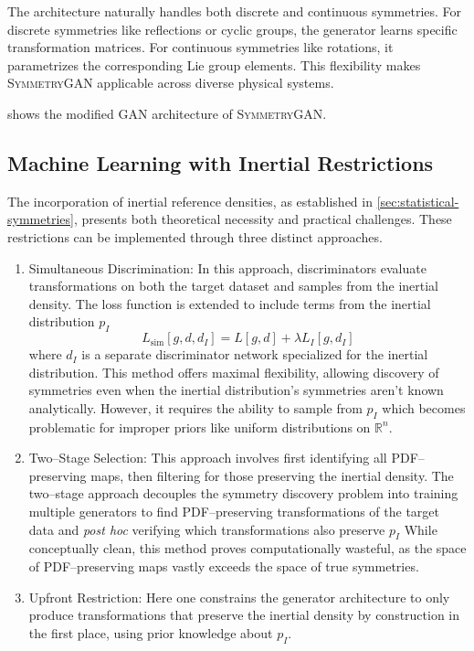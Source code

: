     The architecture naturally handles both discrete and continuous symmetries.
    For discrete symmetries like reflections or cyclic groups, the generator learns specific transformation matrices.
    For continuous symmetries like rotations, it parametrizes the corresponding Lie group elements.
    This flexibility makes \textsc{SymmetryGAN} applicable across diverse physical systems.

     shows the modified GAN architecture of \textsc{SymmetryGAN}.
    
    \subsection{Machine Learning with Inertial Restrictions}
    The incorporation of inertial reference densities, as established in \cref{sec:statistical-symmetries}, presents both theoretical necessity and practical challenges.
    These restrictions can be implemented through three distinct approaches.
    \begin{enumerate}
        \item Simultaneous Discrimination:
            In this approach, discriminators evaluate transformations on both the target dataset and samples from the inertial density.
            The loss function is extended to include terms from the inertial distribution \(p_I\)
            \[
                L_{\text{sim}}[g,d,d_I] = L[g,d] + \lambda L_I[g,d_I]
            \]
            where \(d_I\) is a separate discriminator network specialized for the inertial distribution.
            This method offers maximal flexibility, allowing discovery of symmetries even when the inertial distribution's symmetries aren't known analytically.
            However, it requires the ability to sample from \(p_I\) which becomes problematic for improper priors like uniform distributions on \(\mathbb{R}^n\).
        \item Two--Stage Selection:
            This approach involves first identifying all PDF--preserving maps, then filtering for those preserving the inertial density.
            The two--stage approach decouples the symmetry discovery problem into training multiple generators to find PDF--preserving transformations of the target data and \textit{post hoc} verifying which transformations also preserve \(p_I\)
            While conceptually clean, this method proves computationally wasteful, as the space of PDF--preserving maps vastly exceeds the space of true symmetries.
        \item Upfront Restriction:
            Here one constrains the generator architecture to only produce transformations that preserve the inertial density by construction in the first place, using prior knowledge about \(p_I\).
    \end{enumerate}
